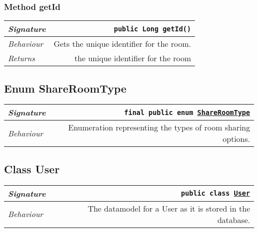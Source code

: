\begin{adjustwidth}{1.5em}{0pt}
\begin{adjustwidth}{1.5em}{0pt}
\begin{adjustwidth}{1.5em}{0pt}
{\begin{tabularx}{1.0\linewidth}{@{}l R@{}}
      \end{tabularx}}
    \end{adjustwidth}\subsubsection{Method getId\label{edu.kit.hci.soli.domain.Room@getId()}}
    \begin{adjustwidth}{1.5em}{0pt}
      {\begin{tabularx}{1.0\linewidth}{@{}l R@{}}
        \emph{Signature} & \texttt{public \texttt{Long} getId()} \\
        \hline
        \emph{Behaviour} & Gets the unique identifier for the room.    \\
        \hline
        \emph{Returns} & the unique identifier for the room  \\
        \hline
  
      \end{tabularx}}
    \end{adjustwidth}
  \end{adjustwidth}\subsection{Enum ShareRoomType\label{edu.kit.hci.soli.domain.ShareRoomType} }
  \begin{adjustwidth}{1.5em}{0pt}
    {\begin{tabularx}{1.0\linewidth}{@{}l R@{}}
      \emph{Signature} & \texttt{final public  enum \texttt{\hyperref[edu.kit.hci.soli.domain.ShareRoomType]{\texttt{ShareRoomType}}}} \\
      \hline
      \emph{Behaviour} & Enumeration representing the types of room sharing options.  \\
      \hline
  
    \end{tabularx}}
  \end{adjustwidth}\subsection{Class User\label{edu.kit.hci.soli.domain.User} }
  \begin{adjustwidth}{1.5em}{0pt}
    {\begin{tabularx}{1.0\linewidth}{@{}l R@{}}
      \emph{Signature} & \texttt{public  class \texttt{\hyperref[edu.kit.hci.soli.domain.User]{\texttt{User}}}} \\
      \hline
      \emph{Behaviour} & The datamodel for a User as it is stored in the database.  \\
      \hline
  

\end{tabularx}}
\end{adjustwidth}
\end{adjustwidth}
